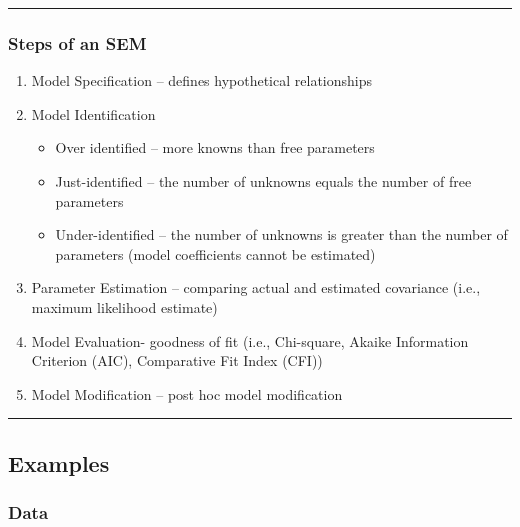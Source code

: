 \documentclass[
]{article}
\providecommand{\tightlist}{%
  \setlength{\itemsep}{0pt}\setlength{\parskip}{0pt}}
\begin{document}
\begin{center}\rule{0.5\linewidth}{0.5pt}\end{center}

\hypertarget{steps-of-an-sem}{%
\subsubsection{Steps of an SEM}\label{steps-of-an-sem}}

\begin{enumerate}
\def\labelenumi{\arabic{enumi}.}
\tightlist
\item
  Model Specification -- defines hypothetical relationships
\item
  Model Identification

  \begin{itemize}
  \tightlist
  \item
    Over identified -- more knowns than free parameters
  \item
    Just-identified -- the number of unknowns equals the number of free
    parameters
  \item
    Under-identified -- the number of unknowns is greater than the
    number of parameters (model coefficients cannot be estimated)
  \end{itemize}
\item
  Parameter Estimation -- comparing actual and estimated covariance
  (i.e., maximum likelihood estimate)
\item
  Model Evaluation- goodness of fit (i.e., Chi-square, Akaike
  Information Criterion (AIC), Comparative Fit Index (CFI))
\item
  Model Modification -- post hoc model modification
\end{enumerate}

\begin{center}\rule{0.5\linewidth}{0.5pt}\end{center}

\hypertarget{examples}{%
\subsection{Examples}\label{examples}}

\hypertarget{data}{%
\subsubsection{Data}\label{data}}
\end{document}
